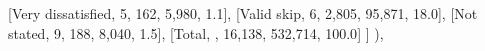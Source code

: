 \documentclass[
  11pt,
  a4paper,
]{article}
\newenvironment{Shaded}{\begin{snugshade}}{\end{snugshade}}
\newcommand{\NormalTok}[1]{\textcolor[rgb]{0.00,0.23,0.31}{#1}}
\newcommand{\StringTok}[1]{\textcolor[rgb]{0.13,0.47,0.30}{#1}}
\begin{document}
\begin{Shaded}
\begin{Highlighting}[]
\NormalTok{            [}\StringTok{\textquotesingle{}Very dissatisfied\textquotesingle{}}\NormalTok{, }\StringTok{\textquotesingle{}5\textquotesingle{}}\NormalTok{, }\StringTok{\textquotesingle{}162\textquotesingle{}}\NormalTok{, }\StringTok{\textquotesingle{}5,980\textquotesingle{}}\NormalTok{, }\StringTok{\textquotesingle{}1.1\textquotesingle{}}\NormalTok{],}
\NormalTok{            [}\StringTok{\textquotesingle{}Valid skip\textquotesingle{}}\NormalTok{, }\StringTok{\textquotesingle{}6\textquotesingle{}}\NormalTok{, }\StringTok{\textquotesingle{}2,805\textquotesingle{}}\NormalTok{, }\StringTok{\textquotesingle{}95,871\textquotesingle{}}\NormalTok{, }\StringTok{\textquotesingle{}18.0\textquotesingle{}}\NormalTok{],}
\NormalTok{            [}\StringTok{\textquotesingle{}Not stated\textquotesingle{}}\NormalTok{, }\StringTok{\textquotesingle{}9\textquotesingle{}}\NormalTok{, }\StringTok{\textquotesingle{}188\textquotesingle{}}\NormalTok{, }\StringTok{\textquotesingle{}8,040\textquotesingle{}}\NormalTok{, }\StringTok{\textquotesingle{}1.5\textquotesingle{}}\NormalTok{],}
\NormalTok{            [}\StringTok{\textquotesingle{}Total\textquotesingle{}}\NormalTok{, }\StringTok{\textquotesingle{}\textquotesingle{}}\NormalTok{, }\StringTok{\textquotesingle{}16,138\textquotesingle{}}\NormalTok{, }\StringTok{\textquotesingle{}532,714\textquotesingle{}}\NormalTok{, }\StringTok{\textquotesingle{}100.0\textquotesingle{}}\NormalTok{]}
\NormalTok{        ]}
\NormalTok{    ),}


\end{Highlighting}
\end{Shaded}
\end{document}
